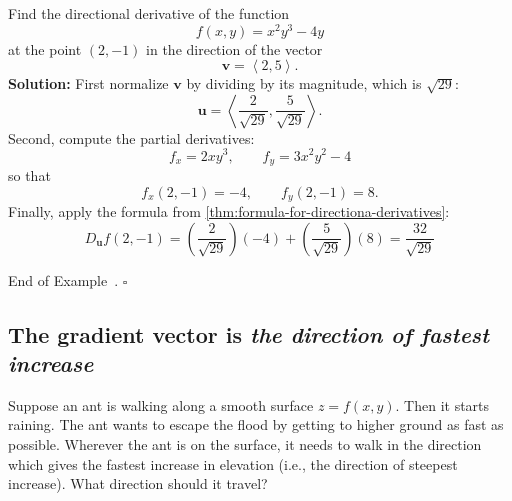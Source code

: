 \documentclass[10pt]{article}
\theoremstyle{definition}
\newtheorem{example}[theorem]{Example}
\renewenvironment{example}
{\begin{oldexample}}
  {\par\smallskip\hfill   End of Example~\theexample. $\square$    \par\end{oldexample}}
\newcommand{\1}[1]{\textbf{1}_{\left[#1\right]}} %
\begin{document}
\begin{example}
  Find the directional derivative of the function
  \begin{equation*}
    f(x,y) = x^{2}y^{3}-4y
  \end{equation*}
  at the point $(2,-1)$ in the direction of the vector
  \begin{equation*}
    \boldsymbol{v} = \left\langle 2,5 \right\rangle.
  \end{equation*}
  \textbf{Solution:} First normalize $\boldsymbol{v}$ by dividing by its
  magnitude, which is $\sqrt{29}$:
  \begin{equation*}
    \boldsymbol{u} = \left\langle \frac{2}{\sqrt{29}}, \frac{5}{\sqrt{29}} \right\rangle.
  \end{equation*}
  Second, compute the partial derivatives:
  \begin{equation*}
    f_{x} = 2xy^{3}, \qquad f_{y} = 3x^{2}y^{2} -4
  \end{equation*}
  so that
  \begin{equation*}
    f_{x}(2,-1) = -4, \qquad f_{y}(2,-1) = 8.
  \end{equation*}
  Finally, apply the formula from \cref{thm:formula-for-directiona-derivatives}:
  \begin{equation*}
    D_{\boldsymbol{u}}f(2,-1) 
    = \left( \frac{2}{\sqrt{29}} \right) (-4) + \left( \frac{5}{\sqrt{29}} \right)(8) 
    = \frac{32}{\sqrt{29}} 
  \end{equation*}
\end{example}

\subsection{The gradient vector is  \textit{the direction of fastest increase}}
Suppose an ant is walking along a smooth surface $z=f(x,y)$. Then it starts
raining. The ant wants to escape the flood by getting to higher ground as fast
as possible. Wherever the ant is on the surface, it needs to walk in the direction
which gives the fastest increase in elevation (i.e., the direction of steepest
increase). What direction should it travel?
\end{document}
